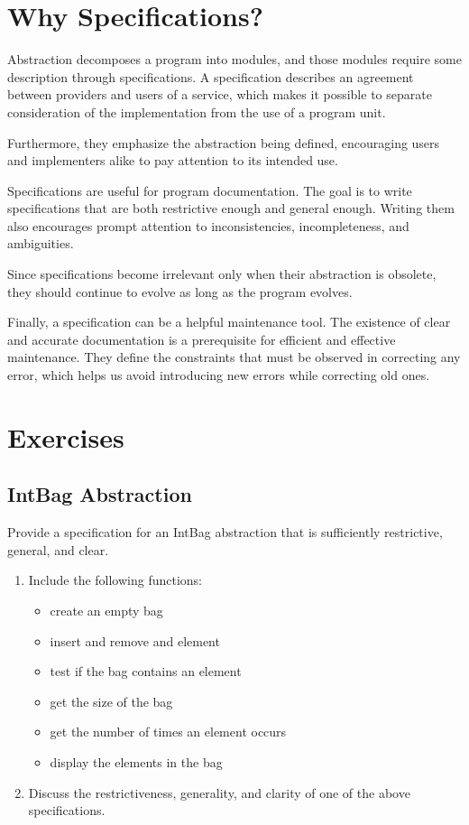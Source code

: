 \documentclass[oneside,11pt,dvipsnames]{book}
\begin{document}
\section{Why Specifications?}
Abstraction decomposes a program into modules, and those modules require some description through specifications. A specification describes an agreement between providers and users of a service, which makes it possible to separate consideration of the implementation from the use of a program unit.

Furthermore, they emphasize the abstraction being defined, encouraging users and implementers alike to pay attention to its intended use.

Specifications are useful for program documentation. The goal is to write specifications that are both restrictive enough and general enough. Writing them also encourages prompt attention to inconsistencies, incompleteness, and ambiguities.

Since specifications become irrelevant only when their abstraction is obsolete, they should continue to evolve as long as the program evolves.

Finally, a specification can be a helpful maintenance tool. The existence of clear and accurate documentation is a prerequisite for efficient and effective maintenance. They define the constraints that must be observed in correcting any error, which helps us avoid introducing new errors while correcting old ones.

\section{Exercises}
\subsection{IntBag Abstraction}
Provide a specification for an IntBag abstraction that is sufficiently restrictive, general, and clear.
\begin{enumerate}
\item Include the following functions:
\begin{itemize}
    \item create an empty bag
    \item insert and remove and element
    \item test if the bag contains an element
    \item get the size of the bag
    \item get the number of times an element occurs
    \item display the elements in the bag
\end{itemize}
\item Discuss the restrictiveness, generality, and clarity of one of the above specifications.
\end{enumerate}
\end{document}
